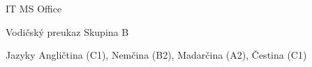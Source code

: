

\begin{cvskills}

  \cvskill
    {IT} %
    {MS Office} %

  \cvskill
    {Vodičský preukaz} %
    {Skupina B} %

  \cvskill
    {Jazyky} %
    {Angličtina (C1), Nemčina (B2), Madarčina (A2), Čestina (C1)} %

\end{cvskills}
